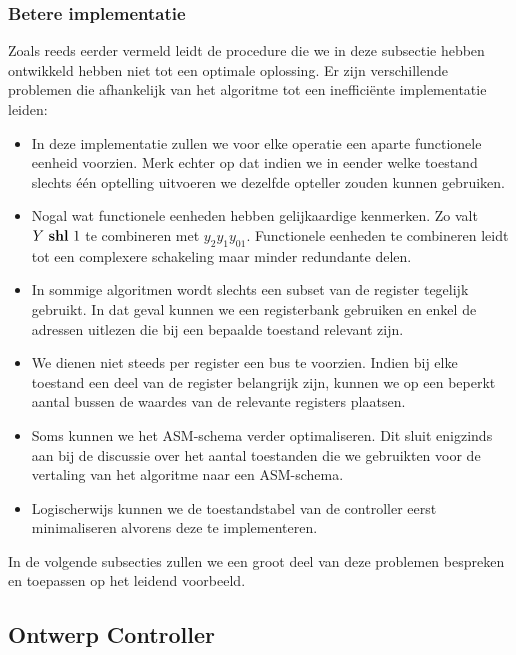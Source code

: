 \subsubsection{Betere implementatie}
Zoals reeds eerder vermeld leidt de procedure die we in deze subsectie hebben ontwikkeld hebben niet tot een optimale oplossing. Er zijn verschillende problemen die afhankelijk van het algoritme tot een ineffici\"ente implementatie leiden:
\begin{itemize}
 \item In deze implementatie zullen we voor elke operatie een aparte functionele eenheid voorzien. Merk echter op dat indien we in eender welke toestand slechts \'e\'en optelling uitvoeren we dezelfde opteller zouden kunnen gebruiken.
 \item Nogal wat functionele eenheden hebben gelijkaardige kenmerken. Zo valt $Y\mbox{ \textbf{shl} }1$ te combineren met $y_2y_1y_01$. Functionele eenheden te combineren leidt tot een complexere schakeling maar minder redundante delen.
 \item In sommige algoritmen wordt slechts een subset van de register tegelijk gebruikt. In dat geval kunnen we een registerbank gebruiken en enkel de adressen uitlezen die bij een bepaalde toestand relevant zijn.
 \item We dienen niet steeds per register een bus te voorzien. Indien bij elke toestand een deel van de register belangrijk zijn, kunnen we op een beperkt aantal bussen de waardes van de relevante registers plaatsen.
 \item Soms kunnen we het ASM-schema verder optimaliseren. Dit sluit enigzinds aan bij de discussie over het aantal toestanden die we gebruikten voor de vertaling van het algoritme naar een ASM-schema.
 \item Logischerwijs kunnen we de toestandstabel van de controller eerst minimaliseren alvorens deze te implementeren.
\end{itemize}
In de volgende subsecties zullen we een groot deel van deze problemen bespreken en toepassen op het leidend voorbeeld.
\subsection{Ontwerp Controller}
\label{ss:syntheseFSMDController}
